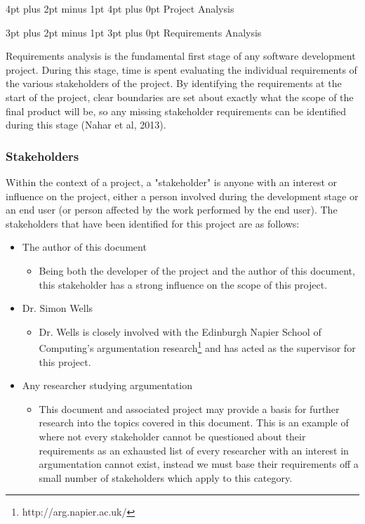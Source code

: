 \documentclass[12pt,a4paper]{article}
\makeatletter
\renewcommand\subsection{\@startsection {subsection}{1}{2mm} %
                               {3pt plus 2pt minus 1pt} %
                               {3pt plus 0pt} %
                               {\normalfont\bfseries}}
\renewcommand\section{\@startsection {section}{1}{0mm} %
                               {4pt plus 2pt minus 1pt} %
                               {4pt plus 0pt} %
                               {\bfseries}}
\makeatother
\begin{document}
\newpage
\section{Project Analysis}

\subsection{Requirements Analysis}

Requirements analysis is the fundamental first stage of any software development project. During this stage, time is spent evaluating the individual requirements of the various stakeholders of the project. By identifying the requirements at the start of the project, clear boundaries are set about exactly what the scope of the final product will be, so any missing stakeholder requirements can be identified during this stage (Nahar et al, 2013).

\subsubsection{Stakeholders}

Within the context of a project, a "stakeholder" is anyone with an interest or influence on the project, either a person involved during the development stage or an end user (or person affected by the work performed by the end user). The stakeholders that have been identified for this project are as follows:
\begin{itemize}
    \item The author of this document
    \begin{itemize}
        \item Being both the developer of the project and the author of this document, this stakeholder has a strong influence on the scope of this project.
    \end{itemize}
    \item Dr. Simon Wells
    \begin{itemize}
        \item Dr. Wells is closely involved with the Edinburgh Napier School of Computing's argumentation research\footnote{http://arg.napier.ac.uk/} and has acted as the supervisor for this project.
    \end{itemize}
    \item Any researcher studying argumentation
    \begin{itemize}
        \item This document and associated project may provide a basis for further research into the topics covered in this document. This is an example of where not every stakeholder cannot be questioned about their requirements as an exhausted list of every researcher with an interest in argumentation cannot exist, instead we must base their requirements off a small number of stakeholders which apply to this category.
    \end{itemize}
\end{itemize}
\end{document}
